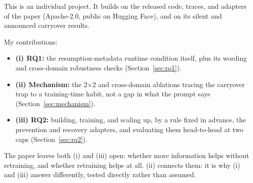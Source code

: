 \documentclass[11pt,a4paper]{article}
\begin{document}
This is an individual project. It builds on the released code, traces, and adapters of the paper
\cite{paper} (Apache-2.0, public on Hugging Face), and on its silent and announced carryover
results.

My contributions:
\begin{itemize}
\item \textbf{(i) RQ1:} the resumption-metadata runtime condition itself, plus its wording and
  cross-domain robustness checks (Section~\ref{sec:rq1}).
\item \textbf{(ii) Mechanism:} the 2$\times$2 and cross-domain ablations tracing the carryover
  trap to a training-time habit, not a gap in what the prompt says (Section~\ref{sec:mechanism}).
\item \textbf{(iii) RQ2:} building, training, and scaling up, by a rule fixed in advance, the
  prevention and recovery adapters, and evaluating them head-to-head at two caps
  (Section~\ref{sec:rq2}).
\end{itemize}

The paper leaves both (i) and (iii) open: whether more information helps without retraining, and
whether retraining helps at all. (ii) connects them: it is why (i) and (iii) answer differently,
tested directly rather than assumed.
\end{document}
